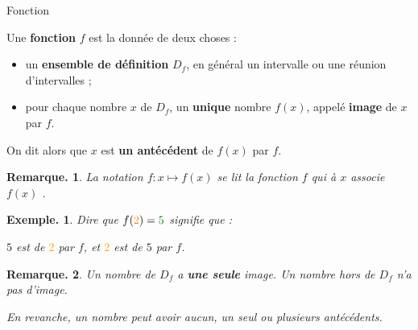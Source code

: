 \documentclass[12pt]{article}
\theoremstyle{break}
\newtheorem*{example}{Exemple.}
\newtheorem*{remark}{Remarque.}
\begin{document}
\begin{definition}{Fonction}{}
  \begin{multihide}
  Une \textbf{fonction} $f$ est la donnée de deux choses :
  \begin{itemize}
    \item un \textbf{ensemble de définition} $D_f$, en général un intervalle ou une réunion d'intervalles ;
    \item pour chaque nombre $x$ de $D_f$, un \textbf{unique} nombre $f(x)$, appelé \textbf{image} de $x$ par $f$.
  \end{itemize}
  On dit alors que $x$ est \textbf{un antécédent} de $f(x)$ par $f$.
  \end{multihide}
\end{definition}

\begin{remark}
  La notation $f : x \mapsto f(x)$ se lit \og la fonction $f$ qui à $x$ associe $f(x)$ \fg{}.
\end{remark}

\begin{example}
  Dire que $f(\textcolor{orange}{2})=\textcolor{green!50!black}{5}$ signifie que :

\begin{center}
\end{center}

\textcolor{green!50!black}{$5$} est \textbf{} de \textcolor{orange}{$2$} par $f$, et \textcolor{orange}{$2$} est \textbf{} de \textcolor{green!50!black}{$5$} par $f$.
\end{example}

\begin{remark}
  Un nombre de $D_f$ a \textbf{une seule} image. Un nombre hors de $D_f$ n'a pas d'image.

  En revanche, un nombre peut avoir aucun, un seul ou plusieurs antécédents.
\end{remark}
\end{document}
